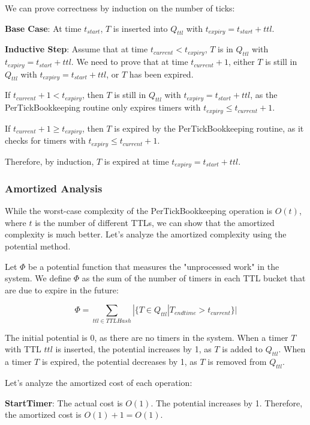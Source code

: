 \documentclass[conference]{IEEEtran}
\begin{document}
We can prove correctness by induction on the number of ticks:

\textbf{Base Case}: At time $t_{start}$, $T$ is inserted into $Q_{ttl}$ with $t_{expiry} = t_{start} + ttl$.

\textbf{Inductive Step}: Assume that at time $t_{current} < t_{expiry}$, $T$ is in $Q_{ttl}$ with $t_{expiry} = t_{start} + ttl$. We need to prove that at time $t_{current} + 1$, either $T$ is still in $Q_{ttl}$ with $t_{expiry} = t_{start} + ttl$, or $T$ has been expired.

If $t_{current} + 1 < t_{expiry}$, then $T$ is still in $Q_{ttl}$ with $t_{expiry} = t_{start} + ttl$, as the PerTickBookkeeping routine only expires timers with $t_{expiry} \leq t_{current} + 1$.

If $t_{current} + 1 \geq t_{expiry}$, then $T$ is expired by the PerTickBookkeeping routine, as it checks for timers with $t_{expiry} \leq t_{current} + 1$.

Therefore, by induction, $T$ is expired at time $t_{expiry} = t_{start} + ttl$.

\subsubsection{Amortized Analysis}
While the worst-case complexity of the PerTickBookkeeping operation is $O(t)$, where $t$ is the number of different TTLs, we can show that the amortized complexity is much better. Let's analyze the amortized complexity using the potential method.

Let $\Phi$ be a potential function that measures the "unprocessed work" in the system. We define $\Phi$ as the sum of the number of timers in each TTL bucket that are due to expire in the future:

\begin{equation}
\Phi = \sum_{ttl \in TTLHash} |\{T \in Q_{ttl} | T_{endtime} > t_{current}\}|
\end{equation}

The initial potential is 0, as there are no timers in the system. When a timer $T$ with TTL $ttl$ is inserted, the potential increases by 1, as $T$ is added to $Q_{ttl}$. When a timer $T$ is expired, the potential decreases by 1, as $T$ is removed from $Q_{ttl}$.

Let's analyze the amortized cost of each operation:

\textbf{StartTimer}: The actual cost is $O(1)$. The potential increases by 1. Therefore, the amortized cost is $O(1) + 1 = O(1)$.
\end{document}
